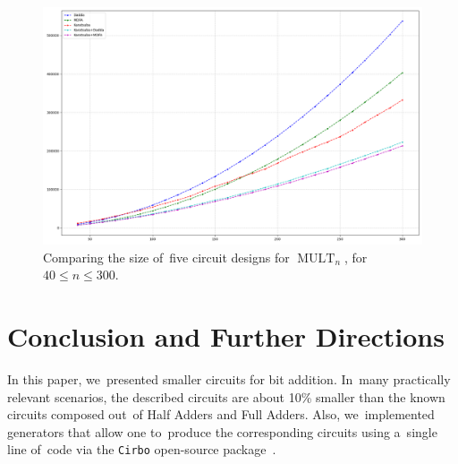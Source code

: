 \documentclass[sigconf, review, anonymous]{acmart}
\DeclareMathOperator{\MULT}{MULT}
\begin{document}
\begin{figure}
	\includegraphics[width=\linewidth]{images/plot40_300_10}
	\caption{Comparing the size of~five circuit designs for $\MULT_n$, for $40 \le n \le 300$.}
	\label{figure:multiplication}
\end{figure}





\section{Conclusion and Further Directions}
In this paper, we~presented smaller circuits for bit addition.
In~many practically relevant scenarios, the described circuits
are about 10\% smaller than the known circuits composed
out~of Half Adders and Full Adders.
Also, we~implemented generators that allow one
to~produce the corresponding circuits using a~single line of~code
via the \texttt{Cirbo} open-source package~\cite{DBLP:conf/aaai/AverkovBEGKKKLL25}.
\end{document}
